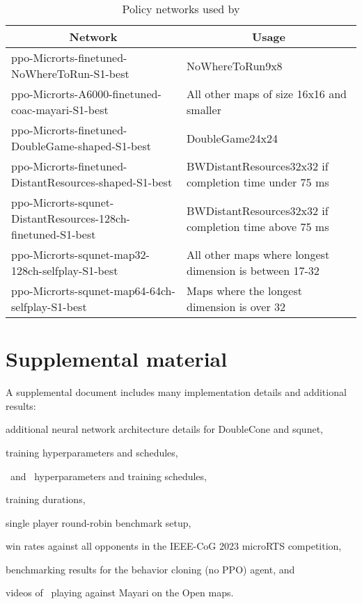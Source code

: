 \documentclass[conference]{IEEEtran}
\begin{document}
\begin{table}[t]
    \caption{Policy networks used by \agentName}
    \label{tab:policy-networks}
    \begin{center}
        \begin{tabular}{p{0.5\linewidth}p{0.5\linewidth}}
            \multicolumn{1}{c}{\bf Network}  &\multicolumn{1}{c}{\bf Usage} \\
            \midrule
            ppo-Microrts-finetuned-NoWhereToRun-S1-best & NoWhereToRun9x8 \\ \hline
            ppo-Microrts-A6000-finetuned-coac-mayari-S1-best & All other maps of size 16x16 and smaller \\ \hline
            ppo-Microrts-finetuned-DoubleGame-shaped-S1-best & DoubleGame24x24 \\ \hline
            ppo-Microrts-finetuned-DistantResources-shaped-S1-best & BWDistantResources32x32 if completion time under 75 ms \\ \hline
            ppo-Microrts-squnet-DistantResources-128ch-finetuned-S1-best & BWDistantResources32x32 if completion time above 75 ms \\ \hline
            ppo-Microrts-squnet-map32-128ch-selfplay-S1-best & All other maps where longest dimension is between 17-32 \\ \hline
            ppo-Microrts-squnet-map64-64ch-selfplay-S1-best & Maps where the longest
            dimension is over 32 \\
        \end{tabular}
    \end{center}
\end{table}

\section{Supplemental material}
A supplemental document includes many implementation details and additional results:
\begin{inparaenum}[(1)]
    \item additional neural network architecture details for DoubleCone and squnet,
    \item training hyperparameters and schedules,
    \item \bcAgent\ and \bcPPOAgent\ hyperparameters and training schedules,
    \item training durations,
    \item single player round-robin benchmark setup,
    \item win rates against all opponents in the IEEE-CoG 2023 microRTS competition,
    \item benchmarking results for the behavior cloning (no PPO) agent, and
    \item videos of \agentName\ playing against Mayari on the Open maps.
\end{inparaenum}
\end{document}
